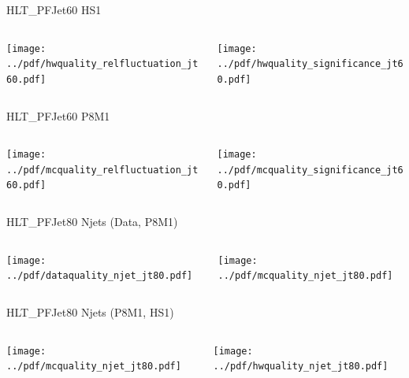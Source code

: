 \documentclass[9pt]{beamer}
\begin{document}
\begin{frame}[t]{HLT\_PFJet60 HS1}
\begin{columns}[T]
  \begin{column}{.5\textwidth}
  \texttt{[image: ../pdf/hwquality\_relfluctuation\_jt60.pdf]}
  \end{column}
  \begin{column}{.5\textwidth}
  \texttt{[image: ../pdf/hwquality\_significance\_jt60.pdf]}
  \end{column}
\end{columns}
\end{frame}

\begin{frame}[t]{HLT\_PFJet60 P8M1}
\begin{columns}[T]
  \begin{column}{.5\textwidth}
  \texttt{[image: ../pdf/mcquality\_relfluctuation\_jt60.pdf]}
  \end{column}
  \begin{column}{.5\textwidth}
  \texttt{[image: ../pdf/mcquality\_significance\_jt60.pdf]}
  \end{column}
\end{columns}
\end{frame}


\begin{frame}[t]{HLT\_PFJet80 Njets (Data, P8M1)}
\begin{columns}[T]
  \begin{column}{.5\textwidth}
  \texttt{[image: ../pdf/dataquality\_njet\_jt80.pdf]}
  \end{column}
  \begin{column}{.5\textwidth}
  \texttt{[image: ../pdf/mcquality\_njet\_jt80.pdf]}
  \end{column}
\end{columns}
\end{frame}

\begin{frame}[t]{HLT\_PFJet80 Njets (P8M1, HS1)}
\begin{columns}[T]
  \begin{column}{.5\textwidth}
  \texttt{[image: ../pdf/mcquality\_njet\_jt80.pdf]}
  \end{column}
  \begin{column}{.5\textwidth}
  \texttt{[image: ../pdf/hwquality\_njet\_jt80.pdf]}
  \end{column}
\end{columns}
\end{frame}
\end{document}
